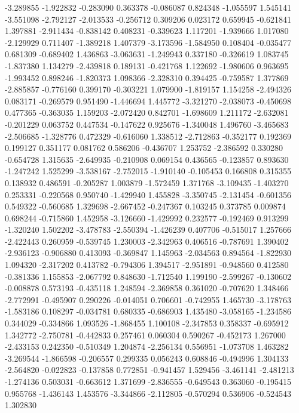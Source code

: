 -3.289855
-1.922832
-0.283090
0.363378
-0.086087
0.824348
-1.055597
1.545141
-3.551098
-2.792127
-2.013533
-0.256712
0.309206
0.023172
0.659945
-0.621841
1.397881
-2.911434
-0.838142
0.408231
-0.339623
1.117201
-1.939666
1.017080
-2.129929
0.711407
-1.389218
1.407379
-3.173596
-1.584950
0.108404
-0.035477
0.681309
-0.689402
1.436863
-3.063631
-1.249943
0.337180
-0.326619
1.083745
-1.837380
1.134279
-2.439818
0.189131
-0.421768
1.122692
-1.980606
0.963695
-1.993452
0.898246
-1.820373
1.098366
-2.328310
0.394425
-0.759587
1.377869
-2.885857
-0.776160
0.399170
-0.303221
1.079900
-1.819157
1.154258
-2.494326
0.083171
-0.269579
0.951490
-1.446694
1.445772
-3.321270
-2.038073
-0.450698
0.477365
-0.363035
1.159203
-2.072420
0.842701
-1.698609
1.211172
-2.632081
-0.201229
0.063752
0.447534
-0.147622
0.925676
-1.340048
1.496760
-3.465683
-2.506685
-1.328776
0.472329
-0.616060
1.338512
-2.712863
-0.352177
0.192369
0.199127
0.351177
0.081762
0.586206
-0.436707
1.253752
-2.386592
0.330280
-0.654728
1.315635
-2.649935
-0.210908
0.069154
0.436565
-0.123857
0.893630
-1.247242
1.525299
-3.538167
-2.752015
-1.910140
-0.105453
0.166808
0.315355
0.138932
0.486591
-0.205287
1.003879
-1.572459
1.371768
-3.109435
-1.403270
0.253331
-0.220568
0.950740
-1.429940
1.455828
-3.350745
-2.131454
-0.601356
0.549322
-0.560685
1.329698
-2.667452
-0.247367
0.103245
0.373785
0.009874
0.698244
-0.715860
1.452958
-3.126660
-1.429992
0.232577
-0.192469
0.913299
-1.320240
1.502202
-3.478783
-2.550394
-1.426239
0.407706
-0.515017
1.257666
-2.422443
0.260959
-0.539745
1.230003
-2.342963
0.406516
-0.787691
1.390402
-2.936123
-0.906880
0.413093
-0.369847
1.145963
-2.034563
0.894564
-1.822930
1.094320
-2.317202
0.413782
-0.794306
1.394517
-2.951891
-0.948560
0.412580
-0.381336
1.155853
-2.067792
0.848630
-1.712540
1.199190
-2.599267
-0.130602
-0.008878
0.573193
-0.435118
1.248594
-2.369858
0.361020
-0.707620
1.348466
-2.772991
-0.495907
0.290226
-0.014051
0.706601
-0.742955
1.465730
-3.178763
-1.583186
0.108297
-0.034781
0.680335
-0.686903
1.435480
-3.058165
-1.234586
0.344029
-0.334866
1.093526
-1.868455
1.100108
-2.347853
0.358337
-0.695912
1.342772
-2.750781
-0.442833
0.257461
0.060304
0.590267
-0.452173
1.267000
-2.433153
0.242350
-0.510349
1.204874
-2.256134
0.556951
-1.073708
1.463282
-3.269544
-1.866598
-0.206557
0.299335
0.056243
0.608846
-0.494996
1.304133
-2.564820
-0.022823
-0.137858
0.772851
-0.941457
1.529456
-3.461141
-2.481213
-1.274136
0.503031
-0.663612
1.371699
-2.836555
-0.649543
0.363060
-0.195415
0.955768
-1.436143
1.453576
-3.344866
-2.112805
-0.570294
0.536906
-0.524543
1.302830
